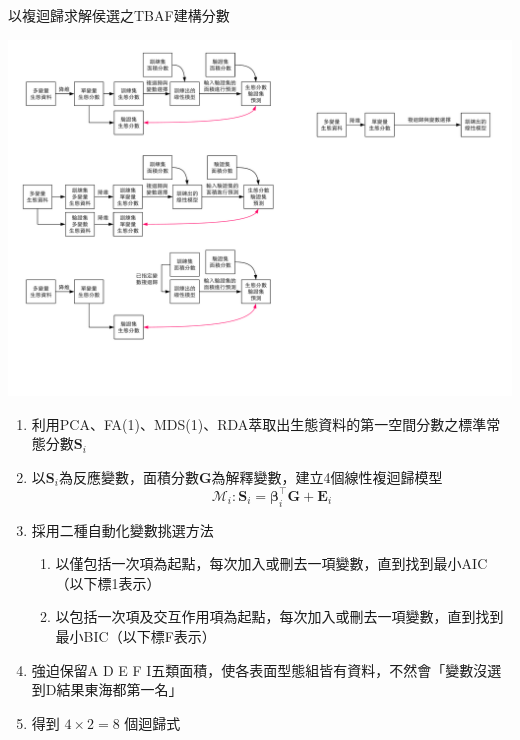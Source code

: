 \documentclass[10pt, aspectratio=1610, xcolor=table]{beamer}
\begin{document}
\begin{frame}{以複迴歸求解侯選之TBAF建構分數}

\includegraphics[width=1\textwidth]{diagram-0.pdf}

\begin{enumerate}
\item 利用PCA、FA(1)、MDS(1)、RDA萃取出生態資料的第一空間分數之標準常態分數$\mathbf{S}_i$
\item 以$\mathbf{S}_i$為反應變數，面積分數$\mathbf{G}$為解釋變數，建立4個線性複迴歸模型\[ \mathcal{M}_i : \mathbf{S}_i =  \mathbf{\beta}_i^\top \mathbf{G} + \mathbf{E}_i \]
\item 採用二種自動化變數挑選方法

	\begin{enumerate}
		\item 以僅包括一次項為起點，每次加入或刪去一項變數，直到找到最小AIC（以下標1表示）
		\item 以包括一次項及交互作用項為起點，每次加入或刪去一項變數，直到找到最小BIC（以下標F表示）
	\end{enumerate}
\item 強迫保留A D E F I五類面積，使各表面型態組皆有資料，不然會「變數沒選到D結果東海都第一名」
\item 得到 $4 \times 2 = 8$ 個迴歸式
\end{enumerate}
\end{frame}
\end{document}
